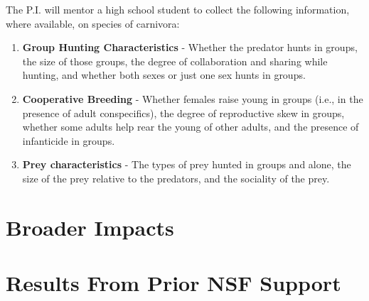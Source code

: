 The P.I. will mentor a high school student to collect the following information, where available, on species of carnivora:
\begin{enumerate}
\item \textbf{Group Hunting Characteristics} - Whether the predator hunts in groups, the size of those groups, the degree of collaboration and sharing while hunting, and whether both sexes or just one sex hunts in groups.
\item \textbf{Cooperative Breeding} - Whether females raise young in groups (i.e., in the presence of adult conspecifics), the degree of reproductive skew in groups, whether some adults help rear the young of other adults, and the presence of infanticide in groups.
\item \textbf{Prey characteristics} - The types of prey hunted in groups and alone, the size of the prey relative to the predators, and the sociality of the prey.
\end{enumerate}


\section{Broader Impacts}

\section{Results From Prior NSF Support}


